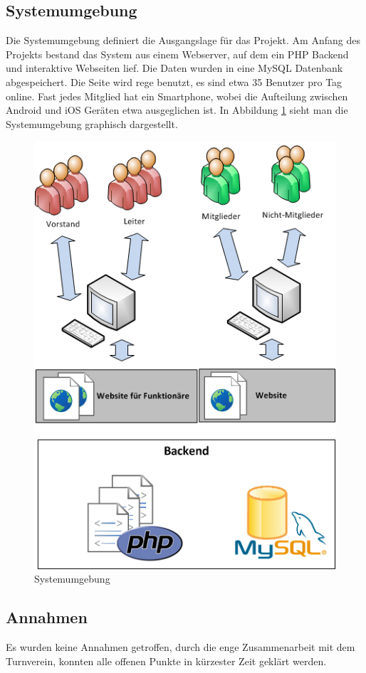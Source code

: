 \subsection{Systemumgebung}\label{systemumgebung}
Die Systemumgebung definiert die Ausgangslage für das Projekt. Am Anfang des Projekts bestand das System aus einem Webserver, auf dem ein PHP Backend und interaktive Webseiten lief. Die Daten wurden in eine MySQL Datenbank abgespeichert. Die Seite wird rege benutzt, es sind etwa 35 Benutzer pro Tag online. Fast jedes Mitglied hat ein Smartphone, wobei die Aufteilung zwischen Android und iOS Geräten etwa ausgeglichen ist. In Abbildung \ref{fig:systemumgebung} sieht man die Systemumgebung graphisch dargestellt.
\begin{figure}[h]
\centering
\includegraphics[scale=0.8]{images/visio/systemumgebung.png}
\caption{Systemumgebung}
\label{fig:systemumgebung}
\end{figure}

\FloatBarrier
\subsection{Annahmen}\label{annahmen}
Es wurden keine Annahmen getroffen, durch die enge Zusammenarbeit mit dem Turnverein, konnten alle offenen Punkte in kürzester Zeit geklärt werden.

